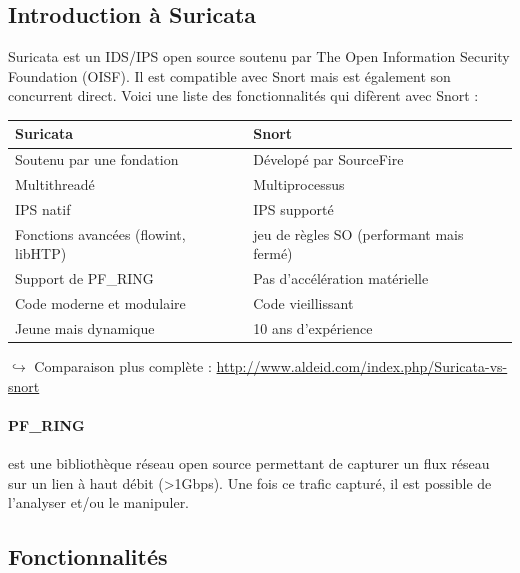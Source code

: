 \documentclass[a4paper,11pt,french]{article}
\begin{document}
\subsection{Introduction à Suricata}

Suricata est un IDS/IPS open source soutenu par The Open Information Security Foundation (OISF). Il est compatible avec Snort mais est également son concurrent direct. Voici une liste des fonctionnalités qui difèrent avec Snort :

\begin{center}
\begin{tabularx}{15cm}{|X|X|}
\hline
\textbf{Suricata}&\textbf{Snort}\\
\hline
Soutenu par une fondation  & Dévelopé par SourceFire\\
Multithreadé & Multiprocessus\\
IPS natif & IPS supporté\\
Fonctions avancées (flowint, libHTP) & jeu de règles SO (performant mais fermé)\\
Support de PF\_RING & Pas d'accélération matérielle\\
Code moderne et modulaire &  Code vieillissant\\
Jeune mais dynamique &  10 ans d'expérience\\
\hline
\end{tabularx}
\end{center}

$\hookrightarrow$ Comparaison plus complète : \url{http://www.aldeid.com/index.php/Suricata-vs-snort}


\paragraph{PF\_RING} est une bibliothèque réseau open source permettant de capturer un flux réseau sur un lien à haut débit (>1Gbps). Une fois ce trafic capturé, il est possible de l’analyser et/ou le manipuler.

\subsection{Fonctionnalités}
\end{document}
